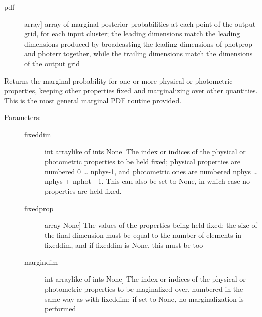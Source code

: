 \documentclass[letterpaper,10pt,english]{sphinxmanual}
\begin{document}
\begin{fulllineitems}
\begin{fulllineitems}
\begin{description}
\begin{description}
\item[{pdf}] \leavevmode{[}array{]}
array of marginal posterior probabilities at each point
of the output grid, for each input cluster; the leading
dimensions match the leading dimensions produced by
broadcasting the leading dimensions of photprop and
photerr together, while the trailing dimensions match
the dimensions of the output grid

\end{description}

\end{description}

\end{fulllineitems}


\begin{fulllineitems}
\label{\detokenize{cluster_slug:slugpy.cluster_slug.cluster_slug.mpdf_gen}}
Returns the marginal probability for one or more physical or
photometric properties, keeping other properties fixed and
marginalizing over other quantities. This is the most general
marginal PDF routine provided.
\begin{description}
\item[{Parameters:}] \leavevmode\begin{description}
\item[{fixeddim}] \leavevmode{[}int \textbar{} arraylike of ints \textbar{} None{]}
The index or indices of the physical or photometric
properties to be held fixed; physical properties are
numbered 0 … nphys-1, and photometric ones are numbered
nphys … nphys + nphot - 1. This can also be set to
None, in which case no properties are held fixed.

\item[{fixedprop}] \leavevmode{[}array \textbar{} None{]}
The values of the properties being held fixed; the size
of the final dimension must be equal to the number of
elements in fixeddim, and if fixeddim is None, this must
be too

\item[{margindim}] \leavevmode{[}int \textbar{} arraylike of ints \textbar{} None{]}
The index or indices of the physical or photometric
properties to be maginalized over, numbered in the same
way as with fixeddim; if set to None, no marginalization
is performed


\end{description}
\end{description}
\end{fulllineitems}
\end{fulllineitems}
\end{document}
